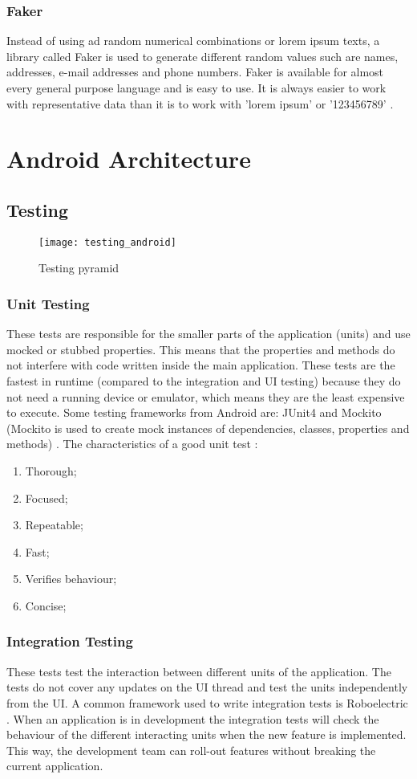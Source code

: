 \subsubsection{Faker}
Instead of using ad random numerical combinations or lorem ipsum texts, a library called Faker is used to generate different random values such are names, addresses, e-mail addresses and phone numbers. Faker is available for almost every general purpose language and is easy to use. It is always easier to work with representative data than it is to work with 'lorem ipsum' or '123456789' \cite{DanieleFaraglia2014}.
\section{Android Architecture}
\subsection{Testing}
\cite{Google_testing2017}
\begin{figure}[h!]
\texttt{[image: testing\_android]}
\centering
\caption{Testing pyramid~\cite{FernandoSproviero2018}}
\end{figure}
\subsubsection{Unit Testing}
These tests are responsible for the smaller parts of the application (units) and use mocked or stubbed properties. This means that the properties and methods do not interfere with code written inside the main application. These tests are the fastest in runtime (compared to the integration and UI testing) because they do not need a running device or emulator, which means they are the least expensive to execute. Some testing frameworks from Android are: JUnit4 and Mockito (Mockito is used to create mock instances of dependencies, classes, properties and methods) \cite{FernandoSproviero2018}. The characteristics of a good unit test \cite{Google_testing2017}:
\begin{enumerate}
\item Thorough;
\item Focused;
\item Repeatable;
\item Fast;
\item Verifies behaviour;
\item Concise;
\end{enumerate}
\subsubsection{Integration Testing}
These tests test the interaction between different units of the application. The tests do not cover any updates on the UI thread and test the units independently from the UI. A common framework used to write integration tests is Roboelectric \cite{Roboelec2019}. When an application is in development the integration tests will check the behaviour of the different interacting units when the new feature is implemented. This way, the development team can roll-out features without breaking the current application.
